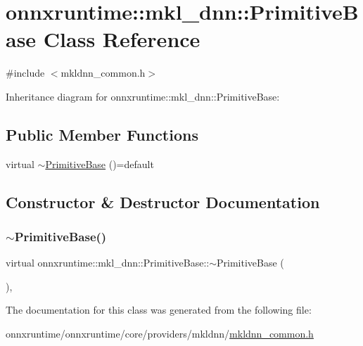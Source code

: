 \hypertarget{classonnxruntime_1_1mkl__dnn_1_1PrimitiveBase}{}\section{onnxruntime\+:\+:mkl\+\_\+dnn\+:\+:Primitive\+Base Class Reference}
\label{classonnxruntime_1_1mkl__dnn_1_1PrimitiveBase}


{\ttfamily \#include $<$mkldnn\+\_\+common.\+h$>$}



Inheritance diagram for onnxruntime\+:\+:mkl\+\_\+dnn\+:\+:Primitive\+Base\+:
\subsection*{Public Member Functions}
\begin{DoxyCompactItemize}
\item 
virtual \mbox{\hyperlink{classonnxruntime_1_1mkl__dnn_1_1PrimitiveBase_a43f72fe9f9e2c783dbb3f8c2ca90b54b}{$\sim$\+Primitive\+Base}} ()=default
\end{DoxyCompactItemize}


\subsection{Constructor \& Destructor Documentation}
\mbox{\label{classonnxruntime_1_1mkl__dnn_1_1PrimitiveBase_a43f72fe9f9e2c783dbb3f8c2ca90b54b}} 
\subsubsection{\texorpdfstring{$\sim$\+Primitive\+Base()}{~PrimitiveBase()}}
{\footnotesize\ttfamily virtual onnxruntime\+::mkl\+\_\+dnn\+::\+Primitive\+Base\+::$\sim$\+Primitive\+Base (\begin{DoxyParamCaption}{ }\end{DoxyParamCaption})\hspace{0.3cm}{\ttfamily [virtual]}, {\ttfamily [default]}}



The documentation for this class was generated from the following file\+:\begin{DoxyCompactItemize}
\item 
onnxruntime/onnxruntime/core/providers/mkldnn/\mbox{\hyperlink{mkldnn__common_8h}{mkldnn\+\_\+common.\+h}}\end{DoxyCompactItemize}

